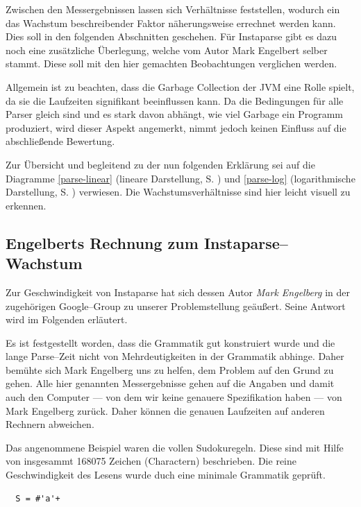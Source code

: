 \documentclass[ngerman,a4paper,abstracton,open=right,twoside=false,toc=listofnumbered,bibtotocnumbered]{scrreprt}
\begin{document}
Zwischen den Messergebnissen lassen sich Verhältnisse feststellen, wodurch ein das Wachstum beschreibender Faktor näherungsweise errechnet werden kann. Dies soll in den folgenden Abschnitten geschehen. Für Instaparse gibt es dazu noch eine zusätzliche Überlegung, welche vom Autor Mark Engelbert selber stammt. Diese soll mit den hier gemachten Beobachtungen verglichen werden.

Allgemein ist zu beachten, dass die Garbage Collection der JVM eine Rolle spielt, da sie die Laufzeiten signifikant beeinflussen kann. Da die Bedingungen für alle Parser gleich sind und es stark davon abhängt, wie viel \glqq{}Garbage\grqq{} ein Programm produziert, wird dieser Aspekt angemerkt, nimmt jedoch keinen Einfluss auf die abschließende Bewertung.

Zur Übersicht und begleitend zu der nun folgenden Erklärung sei auf die Diagramme \ref{parse-linear} (lineare Darstellung, S. \pageref{parse-linear}) und \ref{parse-log} (logarithmische Darstellung, S. \pageref{parse-log}) verwiesen. Die Wachstumsverhältnisse sind hier leicht visuell zu erkennen.

\subsection{Engelberts Rechnung zum Instaparse--Wachstum}\label{Engelberg}

Zur Geschwindigkeit von Instaparse hat sich dessen Autor \emph{Mark Engelberg} in der zugehörigen Google--Group zu unserer Problemstellung geäußert. Seine Antwort wird im Folgenden erläutert. \cite{instaparse-google-group}

Es ist festgestellt worden, dass die Grammatik gut konstruiert wurde und die lange Parse--Zeit nicht von Mehrdeutigkeiten in der Grammatik abhinge. Daher bemühte sich Mark Engelberg uns zu helfen, dem Problem auf den Grund zu gehen. Alle hier genannten Messergebnisse gehen auf die Angaben und damit auch den Computer --- von dem wir keine genauere Spezifikation haben --- von Mark Engelberg zurück. Daher können die genauen Laufzeiten auf anderen Rechnern abweichen.

Das angenommene Beispiel waren die vollen Sudokuregeln. Diese sind mit Hilfe von insgesammt 168075 Zeichen (Charactern) beschrieben. Die reine Geschwindigkeit des Lesens wurde duch eine minimale Grammatik geprüft.

\begin{lstlisting}
  S = #'a'+
\end{lstlisting}
\end{document}
